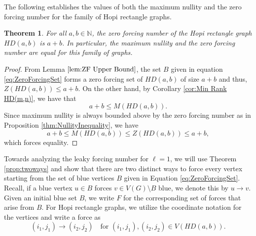 \documentclass[11pt]{article}
\theoremstyle{plain} \newtheorem{question}{Question}
\newtheorem{thm}{Theorem}
\theoremstyle{definition}
\begin{document}
The following establishes the values of both the maximum nullity and the zero forcing number for the family of Hopi rectangle graphs.

\begin{thm}\label{thm: ZF Number of HD(m,n)}
For all $a,b \in \mathbb{N}$, the zero forcing number of the Hopi rectangle graph $HD(a,b)$ is $a+b$. In particular, the maximum nullity and the zero forcing number are equal for this family of graphs.
\end{thm}

\begin{proof}
From Lemma $\ref{lem:ZF Upper Bound}$, the set $B$ given in equation \ref{eq:ZeroForcingSet} forms a zero forcing set of $HD(a,b)$ of size $a+b$ and thus, $Z(HD(a,b)) \leq a+b.$ On the other hand, by Corollary \ref{cor:Min Rank HD(m,n)}, we have that 
\[
a+b \le M(HD(a,b)) .
\]
Since maximum nullity is always bounded above by the zero forcing number as in Proposition \ref{thm:NullityInequality}, we have
\[
a+b \leq M(HD(a,b)) \leq Z(HD(a,b)) \leq a+b,
\]
which forces equality.

\end{proof}

Towards analyzing the leaky forcing number for $\ell=1$, we will use Theorem \ref{prop:twoways} and show that there are two distinct ways to force every vertex starting from the set of blue vertices $B$ given in Equation \ref{eq:ZeroForcingSet}. Recall, if a blue vertex $u \in B$ forces $v \in V(G)\setminus B$ blue, we denote this by $u \to v$. Given an initial blue set $B$, we write $F$ for the corresponding set of forces that arise from $B$. For Hopi rectangle graphs, we utilize the coordinate notation for the vertices and write a force as 
\[
(i_1,j_1) \to (i_2,j_2) \quad \text{for } (i_1,j_1),(i_2,j_2) \in V(HD(a,b)).
\]  
\end{document}
